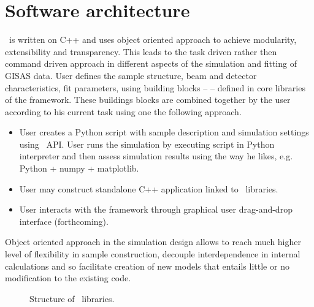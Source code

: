 \newpage
\chapter{Software architecture}
 

\BornAgain\ is written on C++
and uses object oriented approach to 
achieve modularity, extensibility and transparency.
This leads to the task driven rather then command driven approach in 
different aspects  of the simulation and fitting of GISAS data.
User defines the sample structure, beam and detector characteristics,
fit parameters, using building
blocks --  -- defined in core libraries of the framework.
These buildings blocks are combined together by the user according to his current
task using one the following approach.
\begin{itemize}
\item User creates a Python script with sample description and simulation settings
using \BornAgain\ API.
User runs the simulation by executing script in Python interpreter and then assess
simulation results using the way he likes, e.g. Python + numpy + matplotlib.
\item User may construct standalone C++ application linked to \BornAgain\ libraries.
\item User interacts with the framework through graphical 
user drag-and-drop interface (forthcoming).
\end{itemize}

Object oriented approach in the simulation design allows 
to reach much higher level of flexibility in sample construction, 
decouple interdependence in internal calculations and so facilitate creation of new models
that entails little or no modification to the existing code. 


\begin{figure}[htbp]
\centering
\caption{
Structure of \BornAgain\ libraries.
}
\label{fig:two_ratios}
\end{figure}


